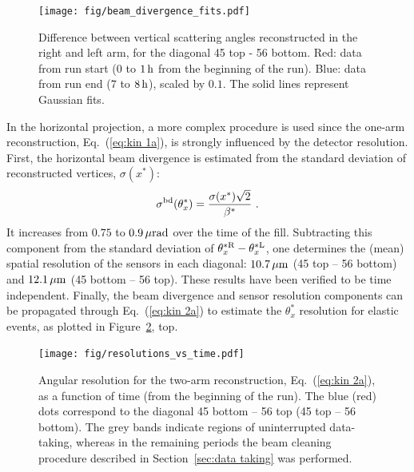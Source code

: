 \begin{figure}
\begin{center}
\texttt{[image: fig/beam\_divergence\_fits.pdf]}
\caption{%
Difference between vertical scattering angles reconstructed in the right and left arm, for the diagonal 45 top - 56 bottom. Red: data from run start ($0$ to $1\,{\rm h}$ from the beginning of the run). Blue: data from run end ($7$ to $8\,{\rm h}$), scaled by $0.1$. The solid lines represent Gaussian fits.
}
\label{fig:beam div vert}
\end{center}
\end{figure}

In the horizontal projection, a more complex procedure is used since the one-arm reconstruction, Eq.~(\ref{eq:kin 1a}), is strongly influenced by the detector resolution. First, the horizontal beam divergence is estimated from the standard deviation of reconstructed vertices, $\sigma(x^*)$:
\begin{equation}
\label{eq:beam div from vertex}
\sigma^{\rm bd}(\theta_x^*) = {\sigma(x^*) \sqrt 2\over \beta^*}\ .
\end{equation}
It increases from $0.75$ to $0.9\,{\rm \mu rad}$ over the time of the fill. Subtracting this component from the standard deviation of $\theta_x^{*\rm R} - \theta_x^{*\rm L}$, one determines the (mean) spatial resolution of the sensors in each diagonal: $10.7\,{\rm \mu m}$ (45 top -- 56 bottom) and $12.1\,{\rm \mu m}$ (45 bottom -- 56 top). These results have been verified to be time independent. Finally, the beam divergence and sensor resolution components can be propagated through Eq.~({\ref{eq:kin 2a}}) to estimate the $\theta_x^*$ resolution for elastic events, as plotted in Figure~\ref{fig:resol final}, top.

\begin{figure}
\begin{center}
\texttt{[image: fig/resolutions\_vs\_time.pdf]}
\caption{%
Angular resolution for the two-arm reconstruction, Eq.~(\ref{eq:kin 2a}), as a function of time (from the beginning of the run). The blue (red) dots correspond to the diagonal 45 bottom -- 56 top (45 top -- 56 bottom). The grey bands indicate regions of uninterrupted data-taking, whereas in the remaining periods the beam cleaning procedure described in Section~\ref{sec:data taking} was performed.
}
\label{fig:resol final}
\end{center}
\end{figure}

